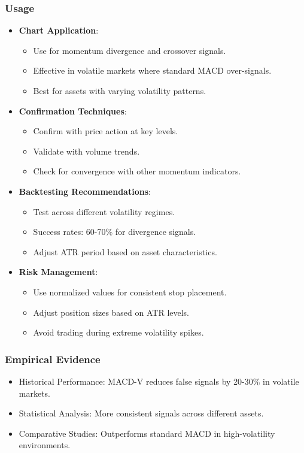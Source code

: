 \documentclass[12pt]{article}
\begin{document}
\subsubsection{Usage}
\begin{itemize}
\item \textbf{Chart Application}:
  \begin{itemize}
  \item Use for momentum divergence and crossover signals.
  \item Effective in volatile markets where standard MACD over-signals.
  \item Best for assets with varying volatility patterns.
  \end{itemize}
\item \textbf{Confirmation Techniques}:
  \begin{itemize}
  \item Confirm with price action at key levels.
  \item Validate with volume trends.
  \item Check for convergence with other momentum indicators.
  \end{itemize}
\item \textbf{Backtesting Recommendations}:
  \begin{itemize}
  \item Test across different volatility regimes.
  \item Success rates: 60-70\% for divergence signals.
  \item Adjust ATR period based on asset characteristics.
  \end{itemize}
\item \textbf{Risk Management}:
  \begin{itemize}
  \item Use normalized values for consistent stop placement.
  \item Adjust position sizes based on ATR levels.
  \item Avoid trading during extreme volatility spikes.
  \end{itemize}
\end{itemize}

\subsubsection{Empirical Evidence}
\begin{itemize}
\item Historical Performance: MACD-V reduces false signals by 20-30\% in volatile markets.
\item Statistical Analysis: More consistent signals across different assets.
\item Comparative Studies: Outperforms standard MACD in high-volatility environments.
\end{itemize}
\end{document}
